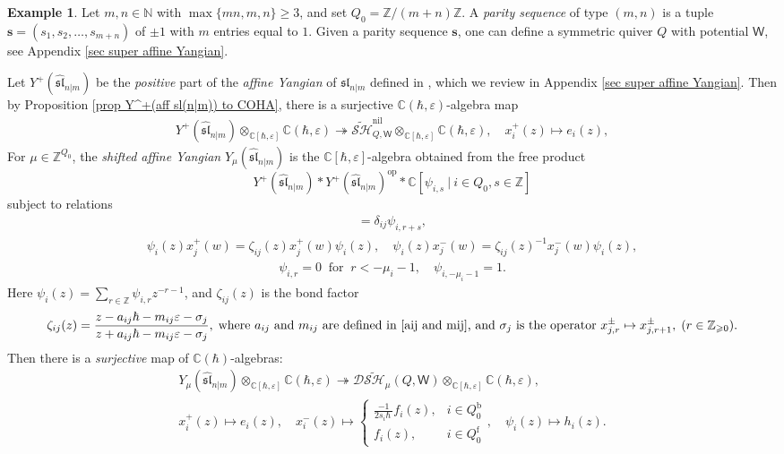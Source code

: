 \documentclass[10pt]{amsart}
\theoremstyle{definition}
\newtheorem{Example}[Theorem]{Example}
\numberwithin{equation}{section}
\newcommand{\bC}{\mathbb{C}}
\newcommand{\bN}{\mathbb{N}}
\newcommand{\bZ}{\mathbb{Z}}
\newcommand{\sW}{\mathsf{W}}
\begin{document}
\begin{Example}\label{ex on vv ex}
Let $m,n\in \bN$ with $\max\{mn,m,n\}\geqslant3$, and set $Q_0=\bZ/(m+n)\bZ$. A \textit{parity sequence} of type $(m,n)$ is a tuple $\mathbf s=(s_1,s_2,\ldots,s_{m+n})$ of $\pm 1$ 
with $m$ entries equal to $1$.
Given a parity sequence $\mathbf s$, one can define a symmetric quiver $Q$ with potential $\sW$, see Appendix \ref{sec super affine Yangian}.

Let $Y^+(\widehat{\mathfrak{sl}}_{n|m})$ be the \textit{positive} part of the \textit{affine Yangian} of $\mathfrak{sl}_{n|m}$ defined in \cite{U,VV1}, which we review in 
Appendix \ref{sec super affine Yangian}. Then by Proposition \ref{prop Y^+(aff sl(n|m)) to COHA}, there is a surjective $\bC(\hbar,\varepsilon)$-algebra map
\begin{align*}
    Y^+(\widehat{\mathfrak{sl}}_{n|m})\otimes_{\bC[\hbar,\varepsilon]}\bC(\hbar,\varepsilon)\twoheadrightarrow \widetilde{\mathcal{SH}}^{\mathrm{nil}}_{Q,\sW}\otimes_{\bC[\hbar,\varepsilon]}\bC(\hbar,\varepsilon),\quad x^+_i(z)\mapsto e_i(z),
\end{align*}
For $\mu\in \bZ^{Q_0}$, the \textit{shifted affine Yangian} $Y_\mu(\widehat{\mathfrak{sl}}_{n|m})$ is the $\bC[\hbar,\varepsilon]$-algebra obtained from the free product $$Y^+(\widehat{\mathfrak{sl}}_{n|m})* Y^+(\widehat{\mathfrak{sl}}_{n|m})^{\mathrm{op}}*\bC[\psi_{i,s}\:|\: i\in Q_0,s\in \bZ]$$ subject to relations
\begin{align*}
    [x^+_{i,r},x^-_{j,s}]=\delta_{ij}\psi_{i,r+s},
\end{align*}
\begin{align}\label{relation for shifted affine yangian of sl(n|m)}
    \psi_i(z)x^+_j(w)=\zeta_{ij}(z)x^+_j(w)\psi_i(z),\quad \psi_i(z)x^-_j(w)=\zeta_{ij}(z)^{-1}x^-_j(w)\psi_i(z),
\end{align}
\begin{align*}
    \psi_{i,r}=0\:\text{ for }\:r<-\mu_i-1,\quad \psi_{i,-\mu_i-1}=1.
\end{align*}
Here $\psi_i(z)=\sum_{r\in\bZ}\psi_{i,r}z^{-r-1}$, and $\zeta_{ij}(z)$ is the bond factor
\begin{align*}
    \zeta_{ij}(z)=\frac{z-a_{ij}\hbar-m_{ij}\varepsilon-\sigma_j}{z+a_{ij}\hbar-m_{ij}\varepsilon-\sigma_j},\;\text{where $a_{ij}$ and $m_{ij}$ are defined in \eqref{aij and mij}, and $\sigma_j$ is the operator } x^\pm_{j,r}\mapsto x^\pm_{j,r+1},\;(r\in \bZ_{\geqslant0}).
\end{align*}
Then there is a \textit{surjective} map of $\bC(\hbar)$-algebras:
\begin{gather*}
Y_\mu(\widehat{\mathfrak{sl}}_{n|m})\otimes_{\bC[\hbar,\varepsilon]}\bC(\hbar,\varepsilon)\twoheadrightarrow \mathcal D\widetilde{\mathcal{SH}}_\mu(Q,\sW)\otimes_{\bC[\hbar,\varepsilon]}\bC(\hbar,\varepsilon),\\
x^+_i(z)\mapsto e_i(z),\quad x^-_i(z)\mapsto \begin{cases}
    \frac{-1}{2s_i\hbar\:}f_i(z), & i\in Q_0^{\mathrm{b}}\\
    f_i(z), & i\in Q_0^{\mathrm{f}}
\end{cases},\quad \psi_i(z)\mapsto h_i(z).
\end{gather*}
\end{Example}
\end{document}
